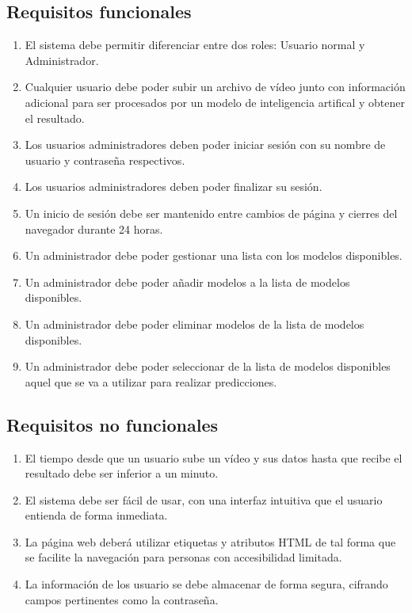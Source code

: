 \subsection{Requisitos funcionales}

\begin{enumerate}[start=1,label={\bfseries RF\arabic*:}]
    \item El sistema debe permitir diferenciar entre dos roles: Usuario normal y
          Administrador.
    \item Cualquier usuario debe poder subir un archivo de vídeo junto con
          información adicional para ser procesados por un modelo de
          inteligencia artifical y obtener el resultado.
    \item Los usuarios administradores deben poder iniciar sesión con su nombre
          de usuario y contraseña respectivos.
    \item Los usuarios administradores deben poder finalizar su sesión.
    \item Un inicio de sesión debe ser mantenido entre cambios de página y
          cierres del navegador durante 24 horas.
    \item Un administrador debe poder gestionar una lista con los modelos
          disponibles.
    \item Un administrador debe poder añadir modelos a la lista de modelos
          disponibles.
    \item Un administrador debe poder eliminar modelos de la lista de modelos
          disponibles.
    \item Un administrador debe poder seleccionar de la lista de modelos
          disponibles aquel que se va a utilizar para realizar predicciones.
\end{enumerate}

\subsection{Requisitos no funcionales}

\begin{enumerate}[start=1,label={\bfseries RNF\arabic*:}]
    \item El tiempo desde que un usuario sube un vídeo y sus datos hasta que
          recibe el resultado debe ser inferior a un minuto.
    \item El sistema debe ser fácil de usar, con una interfaz intuitiva que el
          usuario entienda de forma inmediata.
    \item La página web deberá utilizar etiquetas y atributos HTML de tal forma
          que se facilite la navegación para personas con accesibilidad
          limitada.
    \item La información de los usuario se debe almacenar de forma segura,
          cifrando campos pertinentes como la contraseña.
\end{enumerate}

